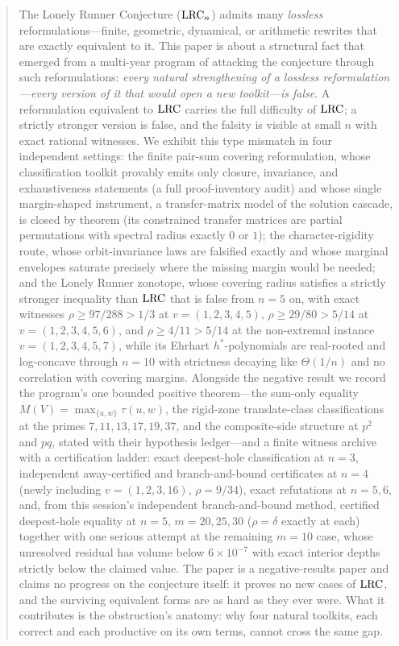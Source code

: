 
\begin{abstract}
\noindent
The Lonely Runner Conjecture ($\lrc_n$) admits many \emph{lossless}
reformulations---finite, geometric, dynamical, or arithmetic rewrites that
are exactly equivalent to it. This paper is about a structural fact that
emerged from a multi-year program of attacking the conjecture through such
reformulations: \emph{every natural strengthening of a lossless
reformulation---every version of it that would open a new toolkit---is
false}. A reformulation equivalent to $\lrc$ carries the full difficulty of
$\lrc$; a strictly stronger version is false, and the falsity is visible
at small $n$ with exact rational witnesses. We exhibit this type mismatch
in four independent settings: the finite pair-sum covering reformulation,
whose classification toolkit provably emits only closure, invariance, and
exhaustiveness statements (a full proof-inventory audit) and whose single
margin-shaped instrument, a transfer-matrix model of the solution cascade,
is closed by theorem (its constrained transfer matrices are partial
permutations with spectral radius exactly $0$ or $1$); the
character-rigidity route, whose orbit-invariance laws are falsified
exactly and whose marginal envelopes saturate precisely where the missing
margin would be needed; and the Lonely Runner zonotope, whose covering
radius satisfies a strictly stronger inequality than $\lrc$ that is false
from $n=5$ on, with exact witnesses
$\rho \ge 97/288 > 1/3$ at $v=(1,2,3,4,5)$,
$\rho \ge 29/80 > 5/14$ at $v=(1,2,3,4,5,6)$, and
$\rho \ge 4/11 > 5/14$ at the non-extremal instance $v=(1,2,3,4,5,7)$,
while its Ehrhart $h^*$-polynomials are real-rooted and log-concave
through $n=10$ with strictness decaying like $\Theta(1/n)$ and no
correlation with covering margins.
Alongside the negative result we record the program's one bounded positive
theorem---the sum-only equality $M(V)=\max_{\{u,w\}}\tau(u,w)$, the
rigid-zone translate-class classifications at the primes
$7,11,13,17,19,37$, and the composite-side structure at $p^2$ and $pq$,
stated with their hypothesis ledger---and a finite witness archive with a
certification ladder: exact deepest-hole classification at $n=3$,
independent away-certified and branch-and-bound certificates at $n=4$
(newly including $v=(1,2,3,16)$, $\rho=9/34$), exact refutations at
$n=5,6$, and, from this session's independent branch-and-bound method,
certified deepest-hole equality at $n=5$, $m=20,25,30$
($\rho=\delta$ exactly at each) together with one serious attempt at the
remaining $m=10$ case, whose unresolved residual has volume below
$6\times10^{-7}$ with exact interior depths strictly below the claimed
value.
The paper is a negative-results paper and claims no progress on the
conjecture itself: it proves no new cases of $\lrc$, and the surviving
equivalent forms are as hard as they ever were. What it contributes is the
obstruction's anatomy: why four natural toolkits, each correct and each
productive on its own terms, cannot cross the same gap.
\end{abstract}

